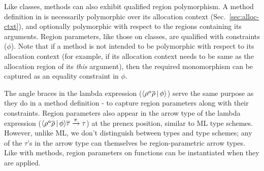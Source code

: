 Like classes, methods can also exhibit qualified region polymorphism.
A method definition in \FB is necessarily polymorphic over its
allocation context (Sec.~\ref{sec:alloc-ctxt}), and optionally
polymorphic with respect to the regions containing its arguments.
Region parameters, like those on classes, are qualified with
constraints ($\phi$).
Note that if a method is not intended to be polymorphic with respect
to its allocation context (for example, if its allocation context
needs to be same as the allocation region of its \emph{this}
argument), then the required monomorphism can be captured as an
equality constraint in $\phi$.  

The angle braces in the lambda expression ($\langle \rho^a\overline{\rho} \,|\,
\phi \rangle$) serve the same purpose as they do in a method definition - to
capture region parameters along with their constraints. Region
parameters also appear in the arrow type of the lambda expression 
($\langle \rho^a\overline{\rho} \,|\, \phi \rangle\overline{\tau} \xrightarrow{\pi}
\tau$) at the prenex position, similar to ML type schemes. However,
unlike ML, we don't distinguish between types and type schemes; any of
the $\tau$'s in the arrow type can themselves be region-parametric
arrow types. Like with methods, region parameters on functions can be
instantiated when they are applied.

